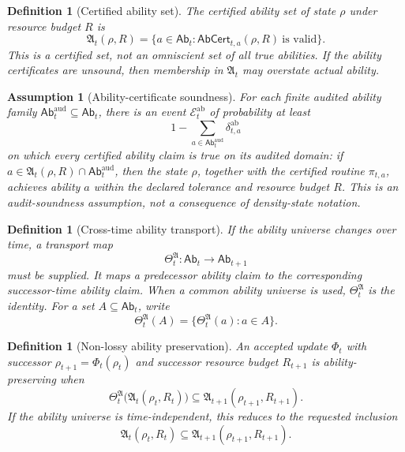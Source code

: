 \documentclass[11pt]{article}
\newtheorem{definition}[theorem]{Definition}
\newtheorem{assumption}[theorem]{Assumption}
\newcommand{\Ecal}{\mathcal{E}}
\newcommand{\1}{\mathbf{1}}
\begin{document}
\begin{definition}[Certified ability set]
\label{def:certified_ability_set}
The certified ability set of state \(\rho\) under resource budget \(R\) is
\[
\boxed{
\mathfrak A_t(\rho,R)
=
\{a\in\mathsf{Ab}_t:\mathsf{AbCert}_{t,a}(\rho,R)\ \text{is valid}\}.
}
\]
This is a certified set, not an omniscient set of all true abilities.  If the ability certificates are unsound, then membership in \(\mathfrak A_t\) may overstate actual ability.
\end{definition}

\begin{assumption}[Ability-certificate soundness]
\label{ass:ability_certificate_soundness}
For each finite audited ability family \(\mathsf{Ab}_t^{\mathrm{aud}}\subseteq\mathsf{Ab}_t\), there is an event \(\Ecal_t^{\mathrm{ab}}\) of probability at least
\[
1-\sum_{a\in\mathsf{Ab}_t^{\mathrm{aud}}}\delta_{t,a}^{\mathrm{ab}}
\]
on which every certified ability claim is true on its audited domain: if \(a\in\mathfrak A_t(\rho,R)\cap\mathsf{Ab}_t^{\mathrm{aud}}\), then the state \(\rho\), together with the certified routine \(\pi_{t,a}\), achieves ability \(a\) within the declared tolerance and resource budget \(R\).  This is an audit-soundness assumption, not a consequence of density-state notation.
\end{assumption}

\begin{definition}[Cross-time ability transport]
\label{def:cross_time_ability_transport}
If the ability universe changes over time, a transport map
\[
\Theta_t^{\mathfrak A}:\mathsf{Ab}_t\to\mathsf{Ab}_{t+1}
\]
must be supplied.  It maps a predecessor ability claim to the corresponding successor-time ability claim.  When a common ability universe is used, \(\Theta_t^{\mathfrak A}\) is the identity.  For a set \(A\subseteq\mathsf{Ab}_t\), write
\[
\Theta_t^{\mathfrak A}(A)=\{\Theta_t^{\mathfrak A}(a):a\in A\}.
\]
\end{definition}

\begin{definition}[Non-lossy ability preservation]
\label{def:nonlossy_ability_preservation}
An accepted update \(\Phi_t\) with successor \(\rho_{t+1}=\Phi_t(\rho_t)\) and successor resource budget \(R_{t+1}\) is ability-preserving when
\[
\boxed{
\Theta_t^{\mathfrak A}\bigl(\mathfrak A_t(\rho_t,R_t)\bigr)
\subseteq
\mathfrak A_{t+1}(\rho_{t+1},R_{t+1}).
}
\]
If the ability universe is time-independent, this reduces to the requested inclusion
\[
\mathfrak A_t(\rho_t,R_t)
\subseteq
\mathfrak A_{t+1}(\rho_{t+1},R_{t+1}).
\]
\end{definition}
\end{document}
